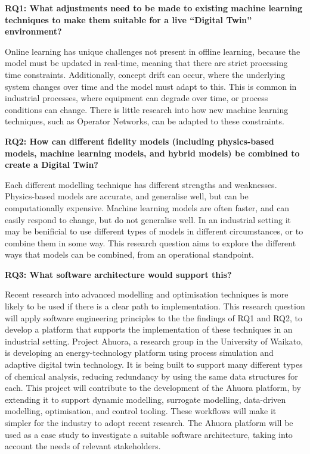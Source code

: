 \documentclass[12pt]{article}
\begin{document}
\textbf{RQ1: What adjustments need to be made to existing machine learning techniques to make them suitable for a live ``Digital Twin'' environment?}

Online learning has unique challenges not present in offline learning, because the model must be updated in real-time, meaning that there are strict processing time constraints. Additionally, concept drift can occur, where the underlying system changes over time and the model must adapt to this. This is common in industrial processes, where equipment can degrade over time, or process conditions can change. There is little research into how new machine learning techniques, such as Operator Networks, can be adapted to these constraints.

\textbf{RQ2: How can different fidelity models (including physics-based models, machine learning models, and hybrid models) be combined to create a Digital Twin?} 

Each different modelling technique has different strengths and weaknesses. Physics-based models are accurate, and generalise well, but can be computationally expensive. Machine learning models are often faster, and can easily respond to change, but do not generalise well. In an industrial setting it may be benificial to use different types of models in different circumstances, or to combine them in some way. This research question aims to explore the different ways that models can be combined, from an operational standpoint.


\textbf{RQ3: What software architecture would support this?}

Recent research into advanced modelling and optimisation techniques is more likely to be used if there is a clear path to implementation. This research question will apply software engineering principles to the the findings of RQ1 and RQ2, to develop a platform that supports the implementation of these techniques in an industrial setting. Project Ahuora, a research group in the University of Waikato, is developing an energy-technology platform using process simulation and adaptive digital twin technology. It is being built to support many different types of chemical analysis, reducing redundancy by using the same data structures for each. This project will contribute to the development of the Ahuora platform, by extending it to support dynamic modelling, surrogate modelling, data-driven modelling, optimisation, and control tooling. These workflows will make it simpler for the industry to adopt recent research. The Ahuora platform will be used as a case study to investigate a suitable software architecture, taking into account the needs of relevant stakeholders.
\end{document}
